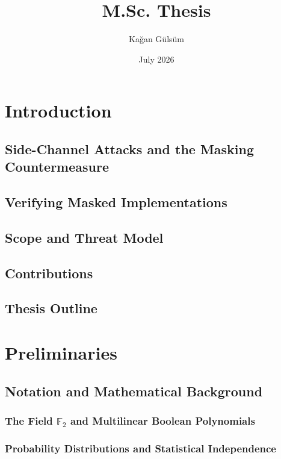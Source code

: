 \documentclass{report}
\title{\textbf{M.Sc. Thesis}}
\author{Kağan Gülsüm}
\date{July 2026}
\begin{document}
\maketitle

\chapter{Introduction}
\section{Side-Channel Attacks and the Masking Countermeasure}
\section{Verifying Masked Implementations}
\section{Scope and Threat Model} 
\section{Contributions}
\section{Thesis Outline}

\chapter{Preliminaries}
\section{Notation and Mathematical Background}
  \subsection{The Field $\mathbb{F}_2$ and Multilinear Boolean Polynomials}
  \subsection{Probability Distributions and Statistical Independence}
\end{document}
